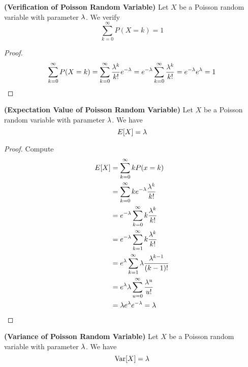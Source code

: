\documentclass{report}
\begin{document}
\begin{theorem}
\label{1.1.15}
\textbf{(Verification of Poisson Random Variable)} Let $X$ be a Poisson random variable with parameter $\lambda $. We verify
\begin{equation}
\sum_{k=0}^\infty P(X=k)=1
\end{equation}
\end{theorem}
\begin{proof}
\begin{equation}
\sum _{k=0}^{\infty}P(X=k)= \sum_{k=0}^{\infty}\frac{\lambda ^k}{k!}e^{-\lambda }=e^{-\lambda }\sum _{k=0}^{\infty}\frac{\lambda ^k}{k!}=e^{-\lambda }e^{\lambda }=1
\end{equation}
\end{proof}
\begin{theorem}
\label{1.1.16}
\textbf{(Expectation Value of Poisson Random Variable)} Let $X$ be a Poisson random variable with parameter $\lambda $. We have
\begin{equation}
E[X]=\lambda 
\end{equation}
\end{theorem}
\begin{proof}
Compute
\begin{align}
E[X]&=\sum_{k=0}^\infty kP(x=k)\\
&=\sum_{k=0}^\infty ke^{-\lambda }\frac{\lambda ^k}{k!}\\
&=e^{-\lambda }\sum_{k=0}^\infty k \frac{\lambda ^k}{k!}\\
&=e^{-\lambda}\sum_{k=1}^\infty k\frac{\lambda ^k}{k!}\\
&=e^{\lambda }\sum_{k=1}^\infty \lambda  \frac{\lambda ^{k-1}}{(k-1)!}\\
&=e^{\lambda }\lambda\sum_{u=0}^\infty \frac{\lambda ^u}{u! }\\
&=\lambda e^{\lambda }e^{-\lambda }=\lambda 
\end{align}
\end{proof}
\begin{theorem}
\label{1.1.17}
\textbf{(Variance of Poisson Random Variable)} Let $X$ be a Poisson random variable with parameter $\lambda $. We have
\begin{equation}
\text{Var} [X]=\lambda 
\end{equation}
\end{theorem}
\end{document}
